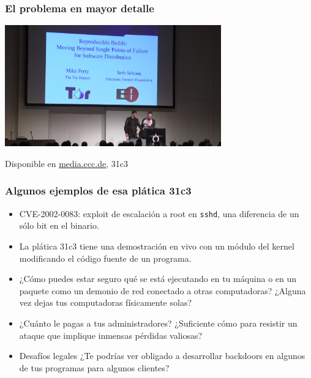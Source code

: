 \documentclass[14pt,aspectratio=169]{beamer}
\begin{document}
\begin{frame}
 \frametitle{El problema en mayor detalle}

 \begin{center}
  \includegraphics[width=0.7\textwidth]{images/31c3.png}

  Disponible en \url{media.ccc.de}, 31c3
 \end{center}
\end{frame}

\begin{frame}[fragile]
 \frametitle{Algunos ejemplos de esa plática 31c3}
 \begin{itemize}
  \item CVE-2002-0083: exploit de escalación a root en \texttt{sshd}, una diferencia de un sólo bit en el binario.
  \item<2-5> La plática 31c3 tiene una demostración en vivo con un módulo del kernel modificando el código fuente de un programa.
  \item<3-5> ¿Cómo puedes estar seguro qué se está ejecutando en tu máquina o en 
  un paquete como un demonio de red conectado a otras computadoras? ¿Alguna vez 
  dejas tus computadoras físicamente solas? 
  \item<4-5> ¿Cuánto le pagas a tus administradores? ¿Suficiente cómo para resistir un ataque que implique      inmensas pérdidas valiosas?
  \item<5> Desafíos legales ¿Te podrías ver obligado a desarrollar backdoors en algunos de tus
  programas para algunos clientes?
 \end{itemize}
\end{frame}
\end{document}
